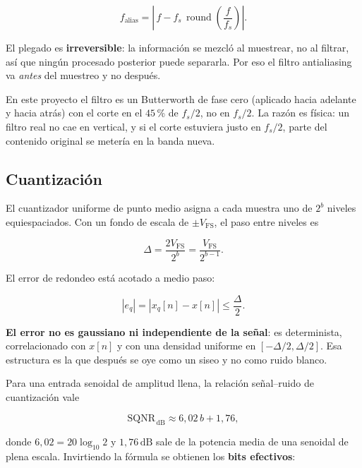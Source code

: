 \documentclass[11pt,a4paper]{article}
\newcommand{\fs}{f_s}
\newcommand{\Vfs}{V_{\mathrm{FS}}}
\newcommand{\dd}{\Delta}
\newcommand{\dB}{\,\mathrm{dB}}
\begin{document}
\begin{equation}
f_{\text{alias}} = \left|\, f - \fs\,
\operatorname{round}\!\left(\frac{f}{\fs}\right) \right| .
\label{eq:alias}
\end{equation}

El plegado es \textbf{irreversible}: la información se mezcló al muestrear, no
al filtrar, así que ningún procesado posterior puede separarla. Por eso el
filtro antialiasing va \emph{antes} del muestreo y no después.

En este proyecto el filtro es un Butterworth de fase cero (aplicado hacia
adelante y hacia atrás) con el corte en el \(45\)\,\% de \(\fs/2\), no en
\(\fs/2\). La razón es física: un filtro real no cae en vertical, y si el corte
estuviera justo en \(\fs/2\), parte del contenido original se metería en la
banda nueva.

\subsection{Cuantización}

El cuantizador uniforme de punto medio asigna a cada muestra uno de \(2^b\)
niveles equiespaciados. Con un fondo de escala de \(\pm\Vfs\), el paso entre
niveles es

\begin{equation}
\dd = \frac{2\Vfs}{2^{b}} = \frac{\Vfs}{2^{b-1}} .
\label{eq:delta}
\end{equation}

El error de redondeo está acotado a medio paso:

\begin{equation}
|e_q| = |x_q[n] - x[n]| \le \frac{\dd}{2} .
\label{eq:error}
\end{equation}

\textbf{El error no es gaussiano ni independiente de la señal}: es
determinista, correlacionado con \(x[n]\) y con una densidad uniforme en
\([-\dd/2, \dd/2]\). Esa estructura es la que después se oye como un siseo y
no como ruido blanco.

Para una entrada senoidal de amplitud llena, la relación señal--ruido de
cuantización vale

\begin{equation}
\mathrm{SQNR}_{\dB} \approx 6{,}02\,b + 1{,}76 ,
\label{eq:sqnr}
\end{equation}

donde \(6{,}02 = 20\log_{10}2\) y \(1{,}76\dB\) sale de la potencia media de
una senoidal de plena escala. Invirtiendo la fórmula se obtienen los
\textbf{bits efectivos}:
\end{document}
